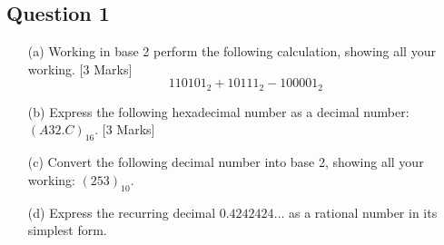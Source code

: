 \documentclass[a4paper,12pt]{article}
\begin{document}

\subsection*{Question 1}
\begin{itemize}
\item[(a)] Working in base 2 perform the following calculation, showing all your working. [3 Marks]
\[110101_2 + 10111_2 - 100001_2\]
\item[(b)] Express the following hexadecimal number as a decimal number: $(A32.C)_{16}$.
[3 Marks]
\item[(c)] Convert the following decimal number into base 2, showing all your working:
$(253)_{10}$. \newline [2 Marks]
\item[(d)]  Express the recurring decimal $0.4242424\ldots$
 as a rational number in its simplest
form.\newline [2 Marks]
\end{itemize}
\end{document}
